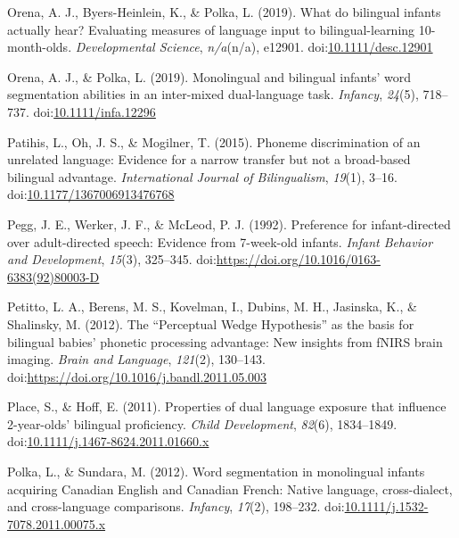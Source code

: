 \documentclass[,man,floatsintext]{apa6}
\begin{document}
\leavevmode\hypertarget{ref-orena_2019}{}%
Orena, A. J., Byers-Heinlein, K., \& Polka, L. (2019). What do bilingual infants actually hear? Evaluating measures of language input to bilingual-learning 10-month-olds. \emph{Developmental Science}, \emph{n/a}(n/a), e12901. doi:\href{https://doi.org/10.1111/desc.12901}{10.1111/desc.12901}

\leavevmode\hypertarget{ref-orena_polka_2019}{}%
Orena, A. J., \& Polka, L. (2019). Monolingual and bilingual infants' word segmentation abilities in an inter-mixed dual-language task. \emph{Infancy}, \emph{24}(5), 718--737. doi:\href{https://doi.org/10.1111/infa.12296}{10.1111/infa.12296}

\leavevmode\hypertarget{ref-patihis_2015}{}%
Patihis, L., Oh, J. S., \& Mogilner, T. (2015). Phoneme discrimination of an unrelated language: Evidence for a narrow transfer but not a broad-based bilingual advantage. \emph{International Journal of Bilingualism}, \emph{19}(1), 3--16. doi:\href{https://doi.org/10.1177/1367006913476768}{10.1177/1367006913476768}

\leavevmode\hypertarget{ref-pegg_1992}{}%
Pegg, J. E., Werker, J. F., \& McLeod, P. J. (1992). Preference for infant-directed over adult-directed speech: Evidence from 7-week-old infants. \emph{Infant Behavior and Development}, \emph{15}(3), 325--345. doi:\href{https://doi.org/https://doi.org/10.1016/0163-6383(92)80003-D}{https://doi.org/10.1016/0163-6383(92)80003-D}

\leavevmode\hypertarget{ref-petitto_2012}{}%
Petitto, L. A., Berens, M. S., Kovelman, I., Dubins, M. H., Jasinska, K., \& Shalinsky, M. (2012). The ``Perceptual Wedge Hypothesis'' as the basis for bilingual babies' phonetic processing advantage: New insights from fNIRS brain imaging. \emph{Brain and Language}, \emph{121}(2), 130--143. doi:\href{https://doi.org/https://doi.org/10.1016/j.bandl.2011.05.003}{https://doi.org/10.1016/j.bandl.2011.05.003}

\leavevmode\hypertarget{ref-place_2011}{}%
Place, S., \& Hoff, E. (2011). Properties of dual language exposure that influence 2-year-olds' bilingual proficiency. \emph{Child Development}, \emph{82}(6), 1834--1849. doi:\href{https://doi.org/10.1111/j.1467-8624.2011.01660.x}{10.1111/j.1467-8624.2011.01660.x}

\leavevmode\hypertarget{ref-polka_2012}{}%
Polka, L., \& Sundara, M. (2012). Word segmentation in monolingual infants acquiring Canadian English and Canadian French: Native language, cross-dialect, and cross-language comparisons. \emph{Infancy}, \emph{17}(2), 198--232. doi:\href{https://doi.org/10.1111/j.1532-7078.2011.00075.x}{10.1111/j.1532-7078.2011.00075.x}
\end{document}
